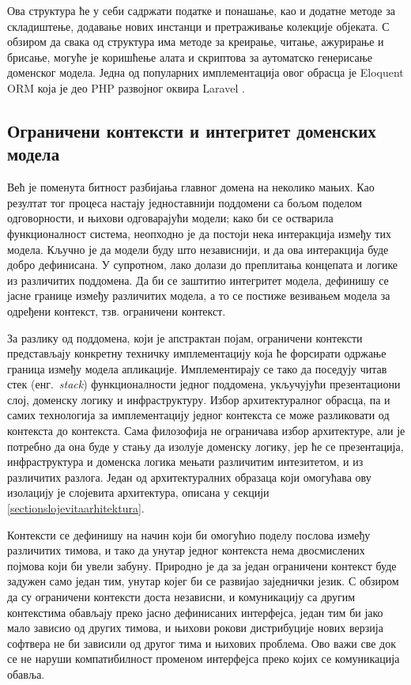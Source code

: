 \documentclass[12pt,oneside]{memoir}
\begin{document}
Ова структура ће у себи садржати податке и понашање, као и додатне методе за складиштење, додавање нових инстанци и претраживање колекције објеката. С обзиром да свака од структура има методе за креирање, читање, ажурирање и брисање, могуће је коришћење алата и скриптова за аутоматско генерисање доменског модела. Једна од популарних имплементација овог обрасца је Eloquent ORM која је део PHP развојног оквира Laravel \cite{Laravel}.

\subsection{Ограничени контексти и интегритет доменских модела}\label{ogranicenikonteksti}
Већ је поменута битност разбијања главног домена на неколико мањих. Као резултат тог процеса настају једноставнији поддомени са бољом поделом одговорности, и њихови одговарајући модели; како би се остварила функционалност система, неопходно је да постоји нека интеракција између тих модела. Кључно је да модели буду што независнији, и да ова интеракција буде добро дефинисана. У супротном, лако долази до преплитања концепата и логике из различитих поддомена. Да би се заштитио интегритет модела, дефинишу се јасне границе између различитих модела, а то се постиже везивањем модела за одређени контекст, тзв. ограничени контекст.

За разлику од поддомена, који је апстрактан појам, ограничени контексти представљају конкретну техничку имплементацију која ће форсирати одржање граница између модела апликације. Имплементирају се тако да поседују читав стек (енг.~\textit{stack}) функционалности једног поддомена, укључујући презентациони слој, доменску логику и инфраструктуру. Избор архитектуралног обрасца, па и самих технологија за имплементацију једног контекста се може разликовати од контекста до контекста. Сама филозофија не ограничава избор архитектуре, али је потребно да она буде у стању да изолује доменску логику, јер ће се презентација, инфраструктура и доменска логика мењати различитим интезитетом, и из различитих разлога. Један од архитектуралних образаца који омогућава ову изолацију је слојевита архитектура, описана у секцији \ref{sectionslojevitaarhitektura}.

Контексти се дефинишу на начин који би омогућио поделу послова између различитих тимова, и тако да унутар једног контекста нема двосмислених појмова који би увели забуну. Природно је да за један ограничени контекст буде задужен само један тим, унутар којег би се развијао заједнички језик. С обзиром да су ограничени контексти доста независни, и комуникацију са другим контекстима обављају преко јасно дефинисаних интерфејса, један тим би јако мало зависио од других тимова, и њихови рокови дистрибуције нових верзија софтвера не би зависили од другог тима и њихових проблема. Ово важи све док се не наруши компатибилност променом интерфејса преко којих се комуникација обавља.
\end{document}
